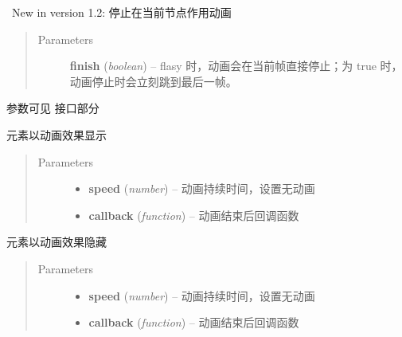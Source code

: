 \documentclass[letterpaper,10pt,english]{sphinxmanual}
\begin{document}

\begin{fulllineitems}
\label{api/core/anim/index:Anim.Node.stop}~New in version 1.2: 停止在当前节点作用动画\begin{quote}\begin{description}
\item[{Parameters}] \leavevmode
\textbf{finish} (\emph{boolean}) -- flasy 时，动画会在当前帧直接停止；为 true 时，动画停止时会立刻跳到最后一帧。

\end{description}\end{quote}

\end{fulllineitems}


参数可见 {\hyperref[api/core/anim/index:Anim.Anim]{}} 接口部分


\begin{fulllineitems}
\label{api/core/anim/index:Anim.Node.show}
元素以动画效果显示
\begin{quote}\begin{description}
\item[{Parameters}] \leavevmode\begin{itemize}
\item {}
\textbf{speed} (\emph{number}) -- 动画持续时间，设置无动画

\item {}
\textbf{callback} (\emph{function}) -- 动画结束后回调函数

\end{itemize}

\end{description}\end{quote}

\end{fulllineitems}



\begin{fulllineitems}
\label{api/core/anim/index:Anim.Node.hide}
元素以动画效果隐藏
\begin{quote}\begin{description}
\item[{Parameters}] \leavevmode\begin{itemize}
\item {}
\textbf{speed} (\emph{number}) -- 动画持续时间，设置无动画

\item {}
\textbf{callback} (\emph{function}) -- 动画结束后回调函数

\end{itemize}

\end{description}\end{quote}

\end{fulllineitems}
\end{document}
